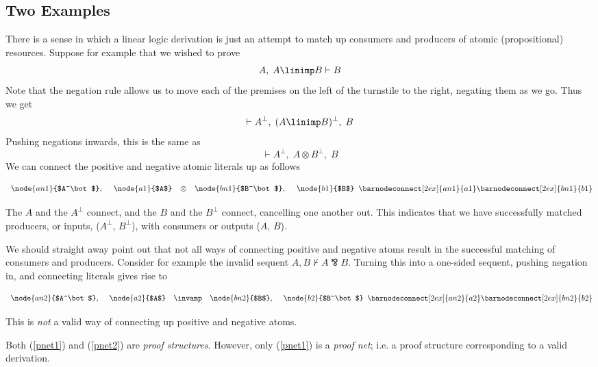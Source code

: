 \subsection{Two Examples}
There is a sense in which a linear logic derivation is just an attempt
to match up consumers and producers of atomic (propositional) resources.
Suppose for example that we wished to prove
\[A,\;A\linimp B \vdash B\]
Note that the negation rule allows us to move each of the premises
on the left of the turnstile to the right, negating them as we go. Thus
we get
\[\vdash A^{\bot},\;(A\linimp B)^{\bot},\;B\]
Pushing negations inwards, this is the same as
\[\vdash A^{\bot},\;A\otimes B^{\bot},\;B\]
We can connect the positive and negative atomic literals up as follows
\begin{ex} \label{pnet1}
\[
\begin{array}{ccccc}
\node{an1}{$A^\bot$}, \hspace*{1ex}
& \node{a1}{$A$}&\otimes&\node{bn1}{$B^\bot$},\hspace*{1ex} &
\node{b1}{$B$}
\end{array}
\barnodeconnect[2ex]{an1}{a1}
\barnodeconnect[2ex]{bn1}{b1}
\]
\end{ex}
The $A$ and the $A^\bot$ connect,  and the $B$ and the $B^\bot$ connect,
cancelling
one another out. This indicates that we have successfully matched producers,
or inputs, ($A^\bot$, $B^\bot$), with consumers or outputs ($A$, $B$).

We should straight away point out that not all ways of connecting positive
and negative atoms result in the successful matching of consumers and 
producers.  Consider for example the invalid sequent 
$A,B\not\vdash A\invamp B$.
Turning this into a one-sided sequent, pushing negation in, and connecting
literals gives rise to
\begin{ex}\label{pnet2}
\[
\begin{array}{ccccc}
\node{an2}{$A^\bot$}, \hspace*{1ex}
& \node{a2}{$A$}&\invamp&\node{bn2}{$B$},\hspace*{1ex} &
\node{b2}{$B^\bot$}
\end{array}
\barnodeconnect[2ex]{an2}{a2}
\barnodeconnect[2ex]{bn2}{b2}
\]
\end{ex}
This is {\em not} a valid way of connecting up positive and negative atoms.

Both (\ref{pnet1}) and (\ref{pnet2}) are {\em proof structures}.  However,
only (\ref{pnet1}) is a {\em proof net}; i.e. a proof structure corresponding
to a valid derivation.


